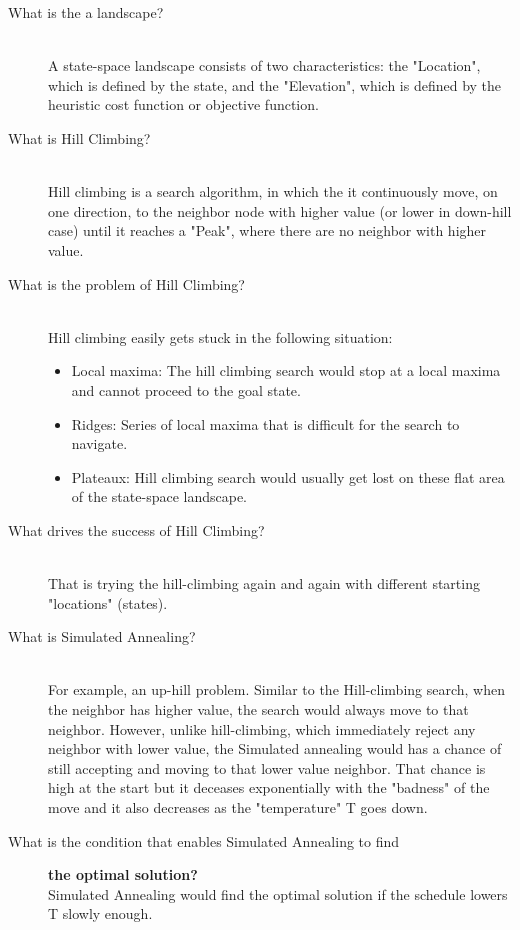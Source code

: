 \documentclass[a4paper, 12pt]{article}
\begin{document}
\begin{enumerate}
\begin{description}
		\item[What is the a landscape?]\hfill \\
			A state-space landscape consists of two characteristics: the "Location", which is defined by the state, and the "Elevation", which is defined by the heuristic cost function or objective function.
			
		\item[What is Hill Climbing?]\hfill \\
			Hill climbing is a search algorithm, in which the it continuously move, on one direction, to the neighbor node with higher value (or lower in down-hill case) until it reaches a "Peak", where there are no neighbor with higher value. 	
		
		\pagebreak
		\item[What is the problem of Hill Climbing?]\hfill \\  
			Hill climbing easily gets stuck in the following situation:
			\begin{itemize}
				\item Local maxima: The hill climbing search would stop at a local maxima and cannot proceed to the goal state.
				\item Ridges: Series of local maxima that is difficult for the search to navigate.
				\item Plateaux: Hill climbing search would usually get lost on these flat area of the state-space landscape.
			\end{itemize}
		
		\item[What drives the success of Hill Climbing?]\hfill \\ 
			That is trying the hill-climbing again and again with different starting "locations" (states).
			
		\item[What is Simulated Annealing?] \hfill \\
			For example, an up-hill problem. Similar to the Hill-climbing search, when the neighbor has higher value, the search would always move to that neighbor. However, unlike hill-climbing, which immediately reject any neighbor with lower value, the Simulated annealing would has a chance of still accepting and moving to that lower value neighbor. That chance is high at the start but it deceases exponentially with the "badness" of the move and it also decreases as the "temperature" T goes down.
			
		\item[What is the condition that enables Simulated Annealing to find]         
		\textbf{the optimal solution?}\hfill\\
			Simulated Annealing would find the optimal solution if the schedule lowers T slowly enough.
		\end{description}
    \end{enumerate}
    
\end{document}
